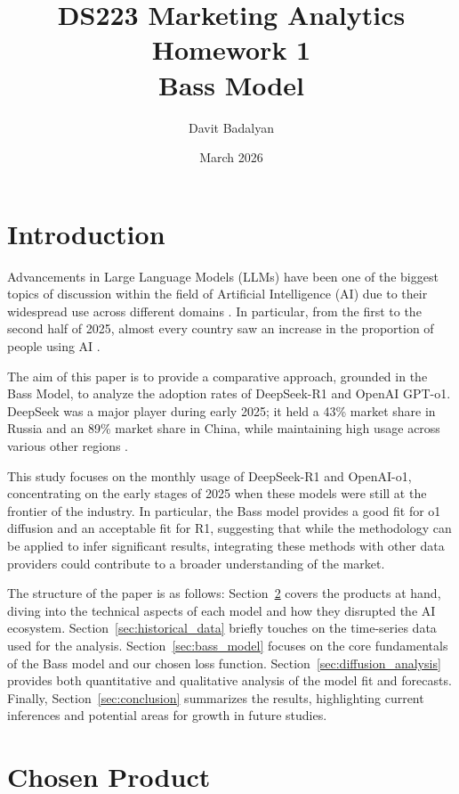 \documentclass{article}
\title{DS223 Marketing Analytics \\ Homework 1 \\ Bass Model}
\author{Davit Badalyan}
\date{March 2026}
\begin{document}
\maketitle
\tableofcontents
\newpage

\section{Introduction}
\label{sec:introduction}
Advancements in Large Language Models (LLMs) have been one of the biggest topics of discussion within the field of Artificial Intelligence (AI) due to their widespread use across different domains \cite{aiindex2025}. In particular, from the first to the second half of 2025, almost every country saw an increase in the proportion of people using AI \cite{microsoft2025globalAI}.

The aim of this paper is to provide a comparative approach, grounded in the Bass Model, to analyze the adoption rates of DeepSeek-R1 and OpenAI GPT-o1. DeepSeek was a major player during early 2025; it held a 43\% market share in Russia and an 89\% market share in China, while maintaining high usage across various other regions \cite{microsoft2025globalAI}.

This study focuses on the monthly usage of DeepSeek-R1 and OpenAI-o1, concentrating on the early stages of 2025 when these models were still at the frontier of the industry. In particular, the Bass model provides a good fit for o1 diffusion and an acceptable fit for R1, suggesting that while the methodology can be applied to infer significant results, integrating these methods with other data providers could contribute to a broader understanding of the market.

The structure of the paper is as follows: Section~\ref{sec:chosen_product} covers the products at hand, diving into the technical aspects of each model and how they disrupted the AI ecosystem. Section~\ref{sec:historical_data} briefly touches on the time-series data used for the analysis. Section~\ref{sec:bass_model} focuses on the core fundamentals of the Bass model and our chosen loss function. Section~\ref{sec:diffusion_analysis} provides both quantitative and qualitative analysis of the model fit and forecasts. Finally, Section~\ref{sec:conclusion} summarizes the results, highlighting current inferences and potential areas for growth in future studies.

\section{Chosen Product}
\label{sec:chosen_product}
\end{document}
